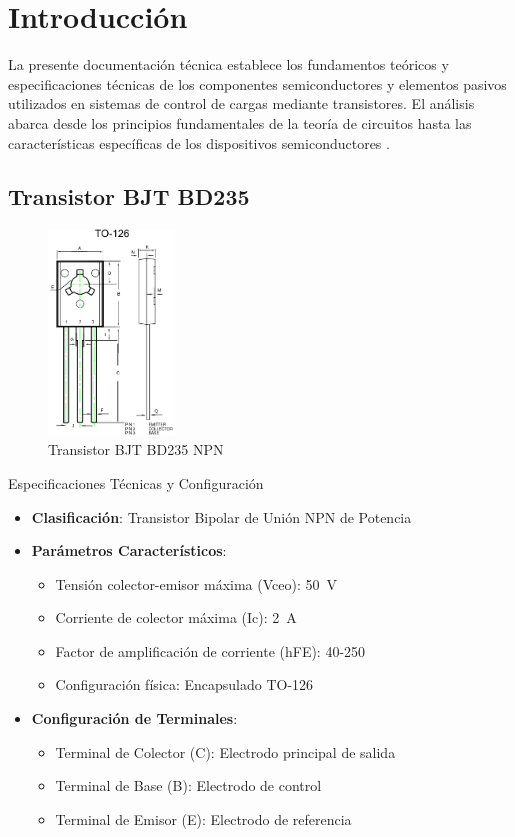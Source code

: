 \section{Introducción}
La presente documentación técnica establece los fundamentos teóricos y especificaciones técnicas de los componentes semiconductores y elementos pasivos utilizados en sistemas de control de cargas mediante transistores. El análisis abarca desde los principios fundamentales de la teoría de circuitos hasta las características específicas de los dispositivos semiconductores \citep{malvino2021electronic}.

\subsection{Transistor BJT BD235}
\begin{figure}[H]
	\centering
	\includegraphics[width=0.3\textwidth]{images/bjt}
	\caption{Transistor BJT BD235 NPN}
	\label{fig:bjt}
\end{figure}
\begin{componentBox}{Especificaciones Técnicas y Configuración \citep{onsemi2021bd235}}
	\begin{itemize}[leftmargin=*,itemsep=1pt,parsep=1pt]
		\item \textbf{Clasificación}: Transistor Bipolar de Unión NPN de Potencia
		\item \textbf{Parámetros Característicos}:
		\begin{itemize}[itemsep=0pt,parsep=0pt]
			\item Tensión colector-emisor máxima (Vceo): \SI{50}{\volt}
			\item Corriente de colector máxima (Ic): \SI{2}{\ampere}
			\item Factor de amplificación de corriente (hFE): 40-250
			\item Configuración física: Encapsulado TO-126
		\end{itemize}
		\item \textbf{Configuración de Terminales}:
		\begin{itemize}[itemsep=0pt,parsep=0pt]
			\item Terminal de Colector (C): Electrodo principal de salida
			\item Terminal de Base (B): Electrodo de control
			\item Terminal de Emisor (E): Electrodo de referencia
		\end{itemize}
	\end{itemize}
\end{componentBox}


